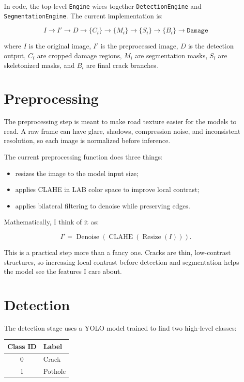 \documentclass[11pt]{article}
\begin{document}
In code, the top-level \texttt{Engine} wires together \texttt{DetectionEngine} and \texttt{SegmentationEngine}. The current implementation is:

\[
I \rightarrow I' \rightarrow D \rightarrow \{C_i\} \rightarrow \{M_i\}
\rightarrow \{S_i\} \rightarrow \{B_i\} \rightarrow \texttt{Damage}
\]

where \(I\) is the original image, \(I'\) is the preprocessed image, \(D\) is the detection output, \(C_i\) are cropped damage regions, \(M_i\) are segmentation masks, \(S_i\) are skeletonized masks, and \(B_i\) are final crack branches.

\section{Preprocessing}

The preprocessing step is meant to make road texture easier for the models to read. A raw frame can have glare, shadows, compression noise, and inconsistent resolution, so each image is normalized before inference.

The current preprocessing function does three things:

\begin{itemize}
    \item resizes the image to the model input size;
    \item applies CLAHE in LAB color space to improve local contrast;
    \item applies bilateral filtering to denoise while preserving edges.
\end{itemize}

Mathematically, I think of it as:

\[
I' = \operatorname{Denoise}(\operatorname{CLAHE}(\operatorname{Resize}(I))).
\]

This is a practical step more than a fancy one. Cracks are thin, low-contrast structures, so increasing local contrast before detection and segmentation helps the model see the features I care about.

\section{Detection}

The detection stage uses a YOLO model trained to find two high-level classes:

\begin{center}
\begin{tabular}{cl}
\toprule
\textbf{Class ID} & \textbf{Label} \\
\midrule
0 & Crack \\
1 & Pothole \\
\bottomrule
\end{tabular}
\end{center}
\end{document}

